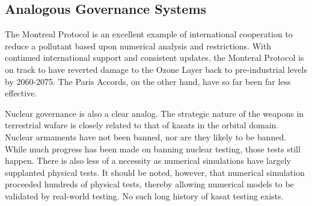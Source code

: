 \subsection{Analogous Governance Systems}


The Montreal Protocol is an excellent example of international
cooperation to reduce a pollutant based upon numerical analysis and
restrictions.\cite{oh-canada} With continued international support and
consistent updates, the Monteral Protocol is on track to have reverted
damage to the Ozone Layer back to pre-industrial levels by
2060-2075.\cite{oh-canada}  The Paris Accords, on the other hand, have
so far been far less effective.\cite{lousy-paris}

Nuclear governance is also a clear analog.  The strategic nature of
the weapons in terrestrial wafare is closely related to that of
\acp{kasat} in the orbital domain.  Nuclear armaments have not been
banned, nor are they likely to be banned.  While much progress has
been made on banning nuclear testing, those tests still happen.  There
is also less of a necessity as numerical simulations have largely
supplanted physical tests.  It should be noted, however, that
numerical simulation proceeded hundreds of physical tests, thereby
allowing numerical models to be validated by real-world testing.  No
such long history of \ac{kasat} testing exists.
